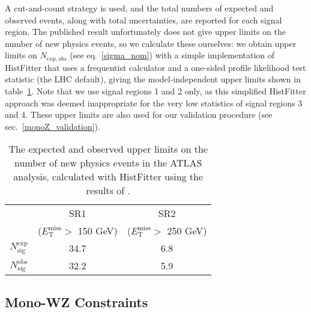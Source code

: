 A cut-and-count strategy is used, and the total numbers of expected and observed events, along with total uncertainties, are reported for each signal region. The published result unfortunately does not give upper limits on the number of new physics events, so we calculate these ourselves: we obtain upper limits on $N_{exp,obs}$ (see eq.~\ref{sigma_nom}) with a simple implementation of HistFitter that uses a frequentist calculator and a one-sided profile likelihood test statistic (the LHC default), giving the model-independent upper limits shown in table~\ref{tab:Nlim_monoZ}. Note that we use signal regions 1 and 2 only, as this simplified HistFitter approach was deemed inappropriate for the very low statistics of signal regions 3 and 4. These upper limits are also used for our validation procedure (see sec.~\ref{monoZ_validation}).

\begin{table}
\begin{center}
\begin{tabular}{ c  c  c }
\hline
\hline
& SR1 & SR2 \T \\
& ($E_{\mathrm{T}}^{\mathrm{miss}} > $ 150 GeV) & ($E_{\mathrm{T}}^{\mathrm{miss}} > $ 250 GeV) \B \\
\hline
$N_{\mathrm{sig}}^{\mathrm{exp}}$ & 34.7 & 6.8 \T \\
$N_{\mathrm{sig}}^{\mathrm{obs}}$ & 32.2 & 5.9 \B \\
\hline
\hline
\end{tabular}
\end{center}
\label{tab:Nlim_monoZ}
\caption{The expected and observed upper limits on the number of new physics events in the ATLAS \monoZ analysis, calculated with HistFitter using the results of \cite{Aad:2014monoZlep}.}
\end{table}

\subsection{Mono-WZ Constraints}
\label{monoWZ_constraints}

